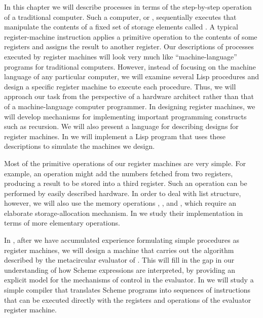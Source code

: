 In this chapter we will describe processes in terms of the step-by-step
operation of a traditional computer.  Such a computer, or , sequentially executes  that manipulate the
contents of a fixed set of storage elements called .  A
typical register-machine instruction applies a primitive operation to the
contents of some registers and assigns the result to another register.  Our
descriptions of processes executed by register machines will look very much
like ``machine-language'' programs for traditional computers.  However, instead
of focusing on the machine language of any particular computer, we will examine
several Lisp procedures and design a specific register machine to execute each
procedure.  Thus, we will approach our task from the perspective of a hardware
architect rather than that of a machine-language computer programmer.  In
designing register machines, we will develop mechanisms for implementing
important programming constructs such as recursion.  We will also present a
language for describing designs for register machines.  In  we
will implement a Lisp program that uses these descriptions to simulate the
machines we design.

Most of the primitive operations of our register machines are very simple.  For
example, an operation might add the numbers fetched from two registers,
producing a result to be stored into a third register.  Such an operation can
be performed by easily described hardware.  In order to deal with list
structure, however, we will also use the memory operations ,
, and , which require an elaborate storage-allocation
mechanism.  In  we study their implementation in terms of more
elementary operations.

In , after we have accumulated experience formulating simple
procedures as register machines, we will design a machine that carries out the
algorithm described by the metacircular evaluator of .  This
will fill in the gap in our understanding of how Scheme expressions are
interpreted, by providing an explicit model for the mechanisms of control in
the evaluator.  In  we will study a simple compiler that
translates Scheme programs into sequences of instructions that can be executed
directly with the registers and operations of the evaluator register machine.








